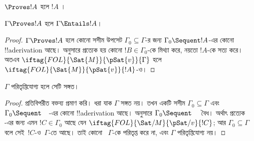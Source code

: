 \documentclass[../../../include/open-logic-section]{subfiles}
\begin{document}
\begin{cor}
$\Proves !A$ হলে $!A$ ।
\end{cor}

\begin{cor}
$\Gamma \Proves !A$ হলে $\Gamma \Entails !A$।
\end{cor}

\begin{proof}
$\Gamma \Proves !A$ হলে কোনো সসীম উপসেট $\Gamma_0 \subseteq
\Gamma$-র জন্য $\Gamma_0 \Sequent !A$-এর কোনো !!a{derivation} আছে।
 অনুসারে প্রত্যেক
হয় কোনো $!B \in \Gamma_0$-কে মিথ্যা করে, নয়তো $!A$-কে সত্য করে।
অতএব $\iftag{FOL}{\Sat{M}}{\pSat{v}}{\Gamma}$ হলে
$\iftag{FOL}{\Sat{M}}{\pSat{v}}{!A}$-ও।
\end{proof}

\begin{cor}
$\Gamma$ পরিতৃপ্তিযোগ্য হলে সেটি সঙ্গত।
\end{cor}

\begin{proof}
প্রতিবিপরীত বক্তব্য প্রমাণ করি। ধরা যাক $\Gamma$ সঙ্গত নয়। তখন একটি
সসীম $\Gamma_0 \subseteq \Gamma$ এবং $\Gamma_0 \Sequent \quad$-এর
কোনো !!a{derivation} আছে।  অনুসারে
$\Gamma_0 \Sequent \quad$ বৈধ। অর্থাৎ প্রত্যেক
-এর
জন্য এমন $!C \in \Gamma_0$ আছে যেন
$\iftag{FOL}{\Sat/{M}}{\pSat/{v}}{!C}$; আর $\Gamma_0
\subseteq \Gamma$ বলে সেই~$!C$-ও~$\Gamma$-তে আছে। তাই কোনো
~$\Gamma$-কে পরিতৃপ্ত করে না,
এবং $\Gamma$ পরিতৃপ্তিযোগ্য নয়।
\end{proof}
\end{document}
